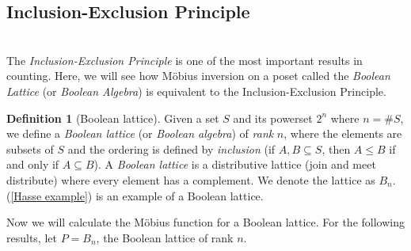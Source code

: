 \documentclass[psamsfonts]{amsart}
\theoremstyle{definition}
\newtheorem{defn}[thm]{Definition}
\theoremstyle{remark}
\numberwithin{equation}{section}
\begin{document}
\subsection{Inclusion-Exclusion Principle} \hfill\\
\indent The \textit{Inclusion-Exclusion Principle} is one of the most important results in counting. Here, we will see how M\"{o}bius inversion on a poset called the \textit{Boolean Lattice} (or \textit{Boolean Algebra}) is equivalent to the Inclusion-Exclusion Principle.

\begin{defn}[Boolean lattice]
 Given a set $S$ and its powerset $2^n$ where $n=\#S$, we define a \textit{Boolean lattice} (or \textit{Boolean algebra}) of \textit{rank} $n$, where the elements are subsets of $S$ and the ordering is defined by \textit{inclusion} (if $A,B\subseteq S$, then $A\leq B$ if and only if $A\subseteq B$). A \textit{Boolean lattice} is a distributive lattice (join and meet distribute) where every element has a complement. We denote the lattice as $B_n$. (\ref{Hasse example}) is an example of a Boolean lattice.
\end{defn}
Now we will calculate the M\"{o}bius function for a Boolean lattice. For the following results, let $P=B_n$, the Boolean lattice of rank $n$. 
\end{document}

